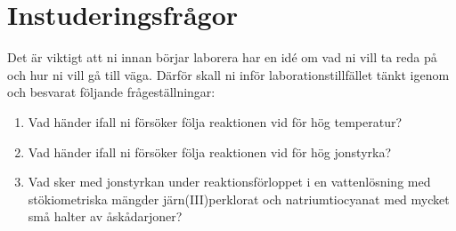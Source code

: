 \section{Instuderingsfrågor}
\label{sec:instudering}
Det är viktigt att ni innan börjar laborera har en idé om vad ni vill ta
reda på och hur ni vill gå till väga. Därför skall ni inför
laborationstillfället tänkt igenom och besvarat följande
frågeställningar:

\begin{enumerate}
\item Vad händer ifall ni försöker följa reaktionen vid för hög
  temperatur?
\item Vad händer ifall ni försöker följa reaktionen vid för hög
  jonstyrka?
\item Vad sker med jonstyrkan under reaktionsförloppet i en vattenlösning
  med stökiometriska mängder järn(III)perklorat och natriumtiocyanat med
  mycket små halter av åskådarjoner?
\end{enumerate}

